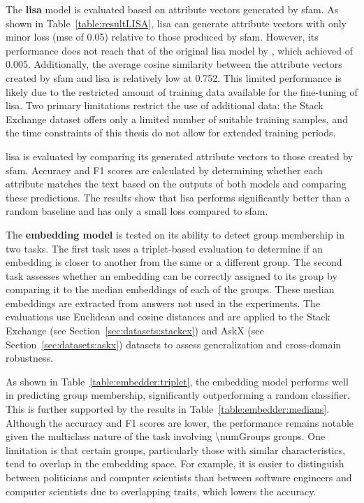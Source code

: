The \textbf{\acs{lisa}} model is evaluated based on attribute vectors generated by \ac{sfam}. As shown in Table~\ref{table:resultLISA}, \ac{lisa} can generate attribute vectors with only minor loss (\acs{mse} of \num{0.05}) relative to those produced by \ac{sfam}. However, its performance does not reach that of the original \ac{lisa} model by \citet{patelLearningInterpretableStyle2023}, which achieved  of \num{0.005}. Additionally, the average cosine similarity between the attribute vectors created by \ac{sfam} and \ac{lisa} is relatively low at \num{0.752}. This limited performance is likely due to the restricted amount of training data available for the fine-tuning of \ac{lisa}. Two primary limitations restrict the use of additional data: the Stack Exchange dataset offers only a limited number of suitable training samples, and the time constraints of this thesis do not allow for extended training periods.

\begin{table}[ht]
  \caption[]{\ac{lisa} is evaluated by comparing its generated attribute vectors to those created by \ac{sfam}. Accuracy and F1 scores are calculated by determining whether each attribute matches the text based on the outputs of both models and comparing these predictions. The results show that \ac{lisa} performs significantly better than a random baseline and has only a small loss compared to \ac{sfam}.}%
  \label{table:resultLISA}
  \centering
  \resultLisa{}
\end{table}

The \textbf{embedding model} is tested on its ability to detect group membership in two tasks. The first task uses a triplet-based evaluation to determine if an embedding is closer to another from the same or a different group. The second task assesses whether an embedding can be correctly assigned to its group by comparing it to the median embeddings of each of the groups. These median embeddings are extracted from answers not used in the experiments. The evaluations use Euclidean and cosine distances and are applied to the Stack Exchange (see Section~\ref{sec:datasets:stackex}) and AskX (see Section~\ref{sec:datasets:askx}) datasets to assess generalization and cross-domain robustness.

As shown in Table~\ref{table:embedder:triplet}, the embedding model performs well in predicting group membership, significantly outperforming a random classifier. This is further supported by the results in Table~\ref{table:embedder:medians}. Although the accuracy and F1 scores are lower, the performance remains notable given the multiclass nature of the task involving \num{\numGroups} groups. One limitation is that certain groups, particularly those with similar characteristics, tend to overlap in the embedding space. For example, it is easier to distinguish between politicians and computer scientists than between software engineers and computer scientists due to overlapping traits, which lowers the accuracy.

